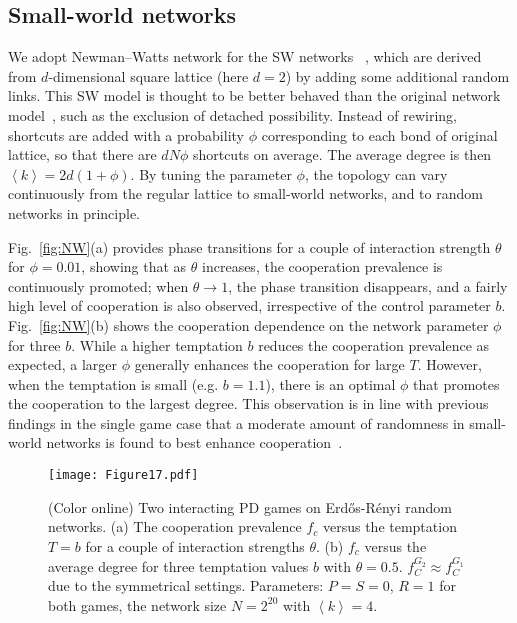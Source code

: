 \documentclass[showpacs,superscriptaddress,reprint,nofootinbib,amsmath,amssymb,aps,pre]{revtex4-1}
\begin{document}
\subsection{Small-world networks}\label{subsec:SW}
We adopt Newman--Watts network for the SW networks ~\cite{newman1999scaling}, which are derived from $d$-dimensional square lattice (here $d=2$) by adding some additional random links. This SW model is thought to be better behaved than the original network model~\cite{watts1998collective}, such as the exclusion of detached possibility. Instead of rewiring, shortcuts are added with a probability $\phi$ corresponding to each bond of original lattice, so that there are $dN\phi$ shortcuts on average. The average degree is then $\left\langle k\right\rangle=2d(1+\phi)$. By tuning the parameter $\phi$, the topology can vary continuously from the regular lattice to small-world networks, and to random networks in principle.

Fig.~\ref{fig:NW}(a) provides phase transitions for a couple of interaction strength $\theta$ for $\phi=0.01$, showing that as $\theta$ increases, the cooperation prevalence is continuously promoted; when $\theta\rightarrow1$, the phase transition disappears, and a fairly high level of cooperation is also observed, irrespective of the control parameter $b$. Fig.~\ref{fig:NW}(b) shows the cooperation dependence on the network parameter $\phi$ for three $b$. While a higher temptation $b$ reduces the cooperation prevalence as expected, a larger $\phi$ generally enhances the cooperation for large $T$. However, when the temptation is small (e.g. $b=1.1$), there is an optimal $\phi$ that promotes the cooperation to the largest degree. This observation is in line with previous findings in the single game case that a moderate amount of randomness in small-world networks is found to best enhance cooperation~\cite{ren2007randomness}.

\begin{figure}[t]
\centering
\texttt{[image: Figure17.pdf]}
\caption{(Color online)
Two interacting PD games on Erd\H{o}s-R\'enyi random networks.
(a) The cooperation prevalence $f_c$ versus the temptation $T=b$ for a couple of interaction strengths $\theta$. 
(b) $f_c$ versus the average degree for three temptation values $b$ with $\theta=0.5$.
$f^{G_2}_C\approx f^{G_1}_C$ due to the symmetrical settings.
Parameters: $P=S=0$, $R=1$ for both games, the network size $N=2^{20}$ with $\left\langle k\right\rangle=4$.
}
\label{fig:ER}
\end{figure}
\end{document}
